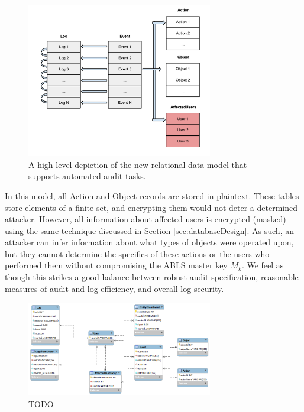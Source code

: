 \documentclass{sig-alternate}
\begin{document}
\begin{figure}[ht!]
\begin{center}
\includegraphics[width=3.2in]{images/relational_design_v2.pdf}
\caption{A high-level depiction of the new relational data model that supports automated audit tasks.}
\label{fig:design2}
\end{center}
\end{figure}

In this model, all Action and Object records are stored in plaintext. These tables store elements of a finite set, and
encrypting them would not deter a determined attacker. However, all information about affected users is encrypted 
(masked) using the same technique discussed in Section \ref{sec:databaseDesign}. As such, an attacker can infer
information about what types of objects were operated upon, but they cannot determine the specifics of these actions
or the users who performed them without compromising the ABLS master key $M_k$. We feel as though this strikes
a good balance between robust audit specification, reasonable measures of audit and log efficiency, and overall 
log security. 

\begin{figure}[htb!]
\begin{center}
\includegraphics[width=3.2in]{images/logSchema.png}
\caption{TODO}
\label{fig:deployment}
\end{center}
\end{figure}
\end{document}
